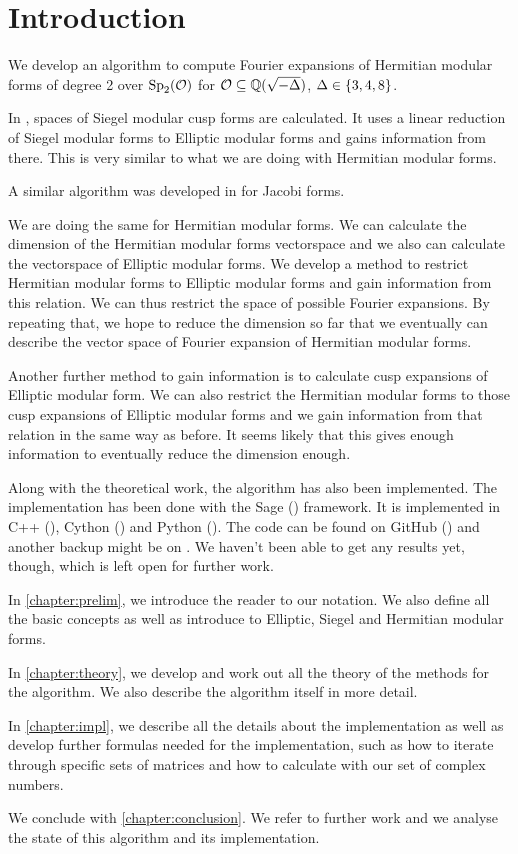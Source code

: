 
\section{Introduction}

We develop an algorithm to compute Fourier expansions of Hermitian modular forms of degree 2 over $\operatorname{Sp}_2(\mathcal{O})$ for $\mathcal{O} \subseteq \mathbb{Q}(\sqrt{-\Delta})$, $\Delta \in \Set{3,4,8}$.

In \cite{PoorYuen07Comp}, spaces of Siegel modular cusp forms are calculated. It uses a linear reduction of Siegel modular forms to Elliptic modular forms and gains information from there. This is very similar to what we are doing with Hermitian modular forms.

A similar algorithm was developed in \cite[Algorithm 4.3]{Raum12Jacobi} for Jacobi forms.

We are doing the same for Hermitian modular forms. We can calculate the dimension of the Hermitian modular forms vectorspace and we also can calculate the vectorspace of Elliptic modular forms. We develop a method to restrict Hermitian modular forms to Elliptic modular forms and gain information from this relation. We can thus restrict the space of possible Fourier expansions. By repeating that, we hope to reduce the dimension so far that we eventually can describe the vector space of Fourier expansion of Hermitian modular forms.

Another further method to gain information is to calculate cusp expansions of Elliptic modular form. We can also restrict the Hermitian modular forms to those cusp expansions of Elliptic modular forms and we gain information from that relation in the same way as before. It seems likely that this gives enough information to eventually reduce the dimension enough.

Along with the theoretical work, the algorithm has also been implemented. The implementation has been done with the Sage (\cite{sage}) framework. It is implemented in C++ (\cite{cpp}), Cython (\cite{cython}) and Python (\cite{python}). The code can be found on GitHub (\cite{Zeyer13Github}) and another backup might be on \cite{Zeyer13Homepage}. We haven't been able to get any results yet, though, which is left open for further work.

In \cref{chapter:prelim}, we introduce the reader to our notation. We also define all the basic concepts as well as introduce to Elliptic, Siegel and Hermitian modular forms.

In \cref{chapter:theory}, we develop and work out all the theory of the methods for the algorithm. We also describe the algorithm itself in more detail.

In \cref{chapter:impl}, we describe all the details about the implementation as well as develop further formulas needed for the implementation, such as how to iterate through specific sets of matrices and how to calculate with our set of complex numbers.

We conclude with \cref{chapter:conclusion}. We refer to further work and we analyse the state of this algorithm and its implementation.
